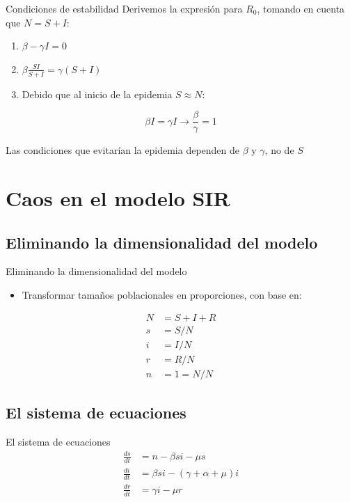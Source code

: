 \documentclass[
  11pt,
  ignorenonframetext,
]{beamer}
\providecommand{\tightlist}{%
  \setlength{\itemsep}{0pt}\setlength{\parskip}{0pt}}
\begin{document}
\begin{frame}{Condiciones de estabilidad}
Derivemos la expresión para \(R_0\), tomando en cuenta que \(N = S+I\):

\begin{enumerate}
\item
  \(\beta - \gamma I = 0\)
\item
  \(\beta \frac{SI}{S+I} = \gamma(S+I)\)
\item
  Debido que al inicio de la epidemia \(S \approx N\):
\end{enumerate}

\[\beta I = \gamma I \rightarrow \frac{\beta}{\gamma} = 1\]

Las condiciones que evitarían la epidemia dependen de \(\beta\) y
\(\gamma\), no de \(S\)
\end{frame}

\hypertarget{caos-en-el-modelo-sir}{%
\section{Caos en el modelo SIR}\label{caos-en-el-modelo-sir}}

\hypertarget{eliminando-la-dimensionalidad-del-modelo}{%
\subsection{Eliminando la dimensionalidad del
modelo}\label{eliminando-la-dimensionalidad-del-modelo}}

\begin{frame}{Eliminando la dimensionalidad del modelo}
\begin{itemize}
\tightlist
\item
  Transformar tamaños poblacionales en proporciones, con base en:
\end{itemize}

\begin{align}
N & = S+I+R \\
s & = S/N \\
i & = I/N \\
r & = R/N \\
n & = 1 = N/N
\end{align}
\end{frame}

\hypertarget{el-sistema-de-ecuaciones}{%
\subsection{El sistema de ecuaciones}\label{el-sistema-de-ecuaciones}}

\begin{frame}{El sistema de ecuaciones}
\begin{align}
\frac{ds}{dt} & = n  - \beta si - \mu s\\
\frac{di}{dt} & = \beta si - (\gamma + \alpha + \mu) i \\
\frac{dr}{dt} & = \gamma i - \mu r
\end{align}
\end{frame}
\end{document}
